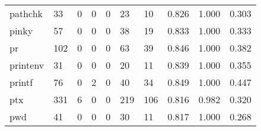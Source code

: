 \begin{longtable}{lp{2.0cm}p{2.0cm}p{2.0cm}p{2.0cm}p{2.0cm}p{2.0cm}p{2.0cm}p{2.0cm}p{2.0cm}}
pathchk   &                     33 &                                             0 &                                            0 &                                           0 &                                           23 &                                         10 &                                0.826 &                                  1.000 &                                0.303 \\
pinky     &                     57 &                                             0 &                                            0 &                                           0 &                                           38 &                                         19 &                                0.833 &                                  1.000 &                                0.333 \\
pr        &                    102 &                                             0 &                                            0 &                                           0 &                                           63 &                                         39 &                                0.846 &                                  1.000 &                                0.382 \\
printenv  &                     31 &                                             0 &                                            0 &                                           0 &                                           20 &                                         11 &                                0.839 &                                  1.000 &                                0.355 \\
printf    &                     76 &                                             0 &                                            2 &                                           0 &                                           40 &                                         34 &                                0.849 &                                  1.000 &                                0.447 \\
ptx       &                    331 &                                             6 &                                            0 &                                           0 &                                          219 &                                        106 &                                0.816 &                                  0.982 &                                0.320 \\
pwd       &                     41 &                                             0 &                                            0 &                                           0 &                                           30 &                                         11 &                                0.817 &                                  1.000 &                                0.268 \\

\end{longtable}
